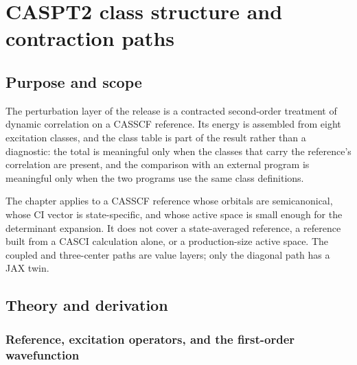 \chapter{CASPT2 class structure and contraction paths}
\label{ch:caspt2-classes}

\section{Purpose and scope}

The perturbation layer of the release is a contracted second-order
treatment of dynamic correlation on a CASSCF reference.  Its energy is
assembled from eight excitation classes, and the class table is part of
the result rather than a diagnostic: the total is meaningful only when
the classes that carry the reference's correlation are present, and the
comparison with an external program is meaningful only when the two
programs use the same class definitions.

The chapter applies to a CASSCF reference whose orbitals are
semicanonical, whose CI vector is state-specific, and whose active space
is small enough for the determinant expansion.  It does not cover a
state-averaged reference, a reference built from a CASCI calculation
alone, or a production-size active space.  The coupled and three-center
paths are value layers; only the diagonal path has a JAX twin.

\section{Theory and derivation}
\label{sec:caspt2-theory}

\subsection{Reference, excitation operators, and the first-order
wavefunction}

